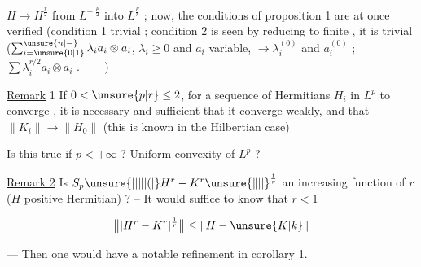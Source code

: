 $H\to H^{\frac r2}$ from $L^{+\;\frac p2}$ into $L^{\frac pr}$ ; now, the conditions of proposition 1 are at once verified \unsure{(|\deleted{(}} (condition 1 trivial ; condition 2 is seen  by reducing to finite ,  it is trivial ($\sum_{i=\unsure{0|1}}^{\unsure{n|-}}\lambda_i a_i\otimes a_i$, $\lambda_i\geq0$ and $a_i$ variable, $\to\lambda_i^{(0)}$ and $a_i^{(0)}$ ;   $\sum\lambda_i^{r/2}a_i\otimes a_i$ . --- --)

\uline{Remark} 1 If $0<\unsure{p|r}\leq2$, for a sequence of Hermitians $H_i$ in $L^p$ to converge , it is necessary and sufficient that it converge weakly, and that $\|K_i\|\to\|H_0\|$ (this is known in the Hilbertian case)

\margin{!}

Is this true if $p<+\infty$ ? Uniform convexity of $L^p$ ?

\uline{Remark 2} Is $S_p\unsure{\lvert|\lVert|(\lvert} H^r-K^r\unsure{\rVert|\rvert}^{\frac1r}$ an increasing function of $r$ ($H$ positive Hermitian) ? -- It would suffice to  know that $r<1$ 

\[
\bigl\|\lvert H^r-K^r\rvert^{\frac1r}\bigr\|\leq\|H-\unsure{K|k}\|
\]

--- Then one would have a notable refinement in corollary 1.
